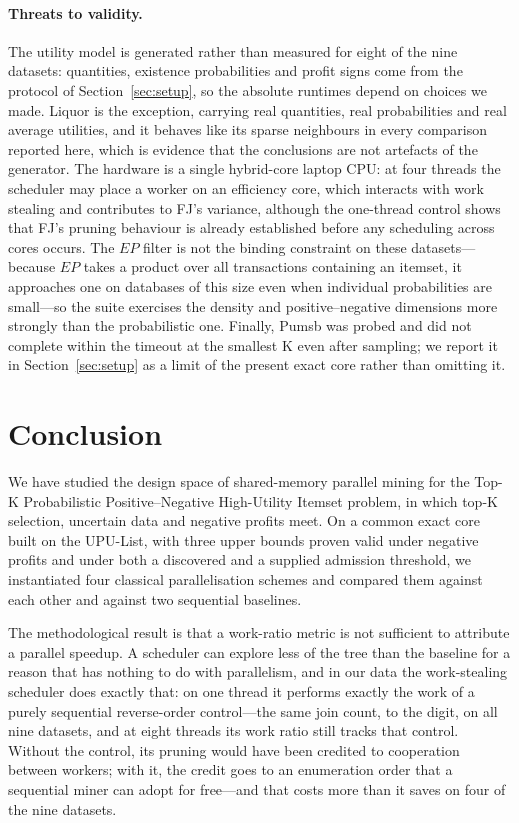 \documentclass[pdflatex,sn-vancouver-num]{sn-jnl}
\theoremstyle{thmstyleone}%
\theoremstyle{thmstyletwo}%
\theoremstyle{thmstylethree}%
\newcommand{\EP}{\mathit{EP}}
\newcommand{\Kk}{\mathrm{K}}
\begin{document}
\paragraph{Threats to validity.}
The utility model is generated rather than measured for eight of the
nine datasets: quantities, existence probabilities and profit signs come
from the protocol of Section~\ref{sec:setup}, so the absolute runtimes
depend on choices we made. Liquor is the exception, carrying real
quantities, real probabilities and real average utilities, and it
behaves like its sparse neighbours in every comparison reported here,
which is evidence that the conclusions are not artefacts of the
generator. The hardware is a single hybrid-core laptop CPU: at four
threads the scheduler may place a worker on an efficiency core, which
interacts with work stealing and contributes to FJ's variance, although
the one-thread control shows that FJ's pruning behaviour is already
established before any scheduling across cores occurs. The $\EP$ filter
is not the binding constraint on these datasets---because $\EP$ takes a
product over all transactions containing an itemset, it approaches one
on databases of this size even when individual probabilities are
small---so the suite exercises the density and positive--negative
dimensions more strongly than the probabilistic one. Finally, Pumsb was
probed and did not complete within the timeout at the smallest $\Kk$ even
after sampling; we report it in Section~\ref{sec:setup} as a limit of the
present exact core rather than omitting it.
 
 
\section{Conclusion}\label{sec:conclusion}
 
We have studied the design space of shared-memory parallel mining for the
Top-$\Kk$ Probabilistic Positive--Negative High-Utility Itemset problem,
in which top-$\Kk$ selection, uncertain data and negative profits meet. On
a common exact core built on the UPU-List, with three upper bounds proven
valid under negative profits and under both a discovered and a supplied
admission threshold, we instantiated four classical parallelisation
schemes and compared them against each other and against two sequential
baselines.
 
The methodological result is that a work-ratio metric is not sufficient
to attribute a parallel speedup. A scheduler can explore less of the tree
than the baseline for a reason that has nothing to do with parallelism,
and in our data the work-stealing scheduler does exactly that: on one thread it performs exactly the work of a purely sequential
reverse-order control---the same join count, to the digit, on all nine
datasets, and at eight threads its work ratio
still tracks that control. Without the control, its pruning would have
been credited to cooperation between workers; with it, the credit goes to
an enumeration order that a sequential miner can adopt for free---and
that costs more than it saves on four of the nine datasets.
 
\end{document}
